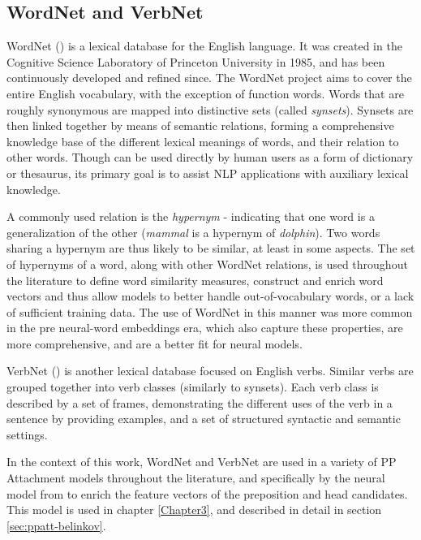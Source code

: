 \subsection{WordNet and VerbNet} \label{sec:wordnet}

WordNet (\cite{wordnet}) is a lexical database for the English language. It was created in the Cognitive Science Laboratory of Princeton University in 1985, and has been continuously developed and refined since. The WordNet project aims to cover the entire English vocabulary, with the exception of function words.  Words that are roughly synonymous are mapped into distinctive sets (called \emph{synsets}). Synsets are then linked together by means of semantic relations, forming a comprehensive knowledge base of the different lexical meanings of words, and their relation to other words. Though can be used directly by human users as a form of dictionary or thesaurus, its primary goal is to assist NLP applications with auxiliary lexical knowledge. 

A commonly used relation is the \emph{hypernym} - indicating that one word is a generalization of the other (\emph{mammal} is a hypernym of \emph{dolphin}). Two words sharing a hypernym are thus likely to be similar, at least in some aspects. The set of hypernyms of a word, along with other WordNet relations, is used throughout the literature to define word similarity measures, construct and enrich word vectors and thus allow models to better handle out-of-vocabulary words, or a lack of sufficient training data. The use of WordNet in this manner was more common in the pre neural-word embeddings era, which also capture these properties, are more comprehensive, and are a better fit for neural models.

VerbNet (\cite{Schuler:05:VBC:1104493}) is another lexical database focused on English verbs. Similar verbs are grouped together into verb classes (similarly to synsets). Each verb class is described by a set  of frames, demonstrating the different uses of the verb in a sentence by providing examples, and a set of structured syntactic and semantic settings. 

In the context of this work, WordNet and VerbNet are used in a variety of PP Attachment models throughout the literature, and specifically by the neural model from \cite{hpcd} to enrich the feature vectors of the preposition and head candidates. This model is used in chapter \ref{Chapter3}, and described in detail in section \ref{sec:ppatt-belinkov}.

\pagebreak